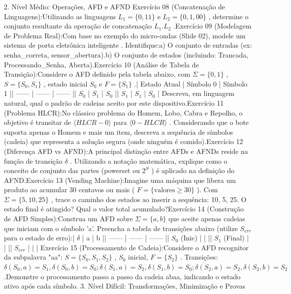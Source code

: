 \documentclass[12pt]{article}
\begin{document}
2. Nível Médio: Operações, AFD e AFND
Exercício 08 (Concatenação de Linguagens):Utilizando as linguagens  $L_1 = \{0, 11\}$  e  $L_2 = \{0, 1, 00\}$ , determine o conjunto resultante da operação de concatenação  $L_1.L_2$ .Exercício 09 (Modelagem de Problema Real):Com base no exemplo do micro-ondas (Slide 02), modele um sistema de  porta eletrônica inteligente . Identifique:a) O conjunto de entradas (ex: senha_correta, sensor_abertura).b) O conjunto de estados (incluindo: Trancada, Processando_Senha, Aberta).Exercício 10 (Análise de Tabela de Transição):Considere o AFD definido pela tabela abaixo, com  $\Sigma = \{0, 1\}$ ,  $S = \{S_0, S_1\}$ , estado inicial  $S_0$  e  $F = \{S_1\}$ .| Estado Atual | Símbolo 0 | Símbolo 1 || ------ | ------ | ------ || $S_0$ | $S_1$ | $S_0$ || $S_1$ | $S_1$ | $S_0$ |
Descreva, em linguagem natural, qual o padrão de cadeias aceito por este dispositivo.Exercício 11 (Problema HLCR):No clássico problema do Homem, Lobo, Cabra e Repolho, o objetivo é transitar de  $\langle HLCR-0 \rangle$  para  $\langle 0-HLCR \rangle$ . Considerando que o bote suporta apenas o Homem e  mais um  item, descreva a sequência de símbolos (cadeia) que representa a solução segura (onde ninguém é comido).Exercício 12 (Diferença AFD vs AFND):A principal distinção entre AFDs e AFNDs reside na função de transição  $\delta$ . Utilizando a notação matemática, explique como o conceito de  conjunto das partes  (powerset ou  $2^S$ ) é aplicado na definição do AFND.Exercício 13 (Vending Machine):Imagine uma máquina que libera um produto ao acumular  30 centavos ou mais  ( $F = \{ \text{valores} \geq 30 \}$ ). Com  $\Sigma = \{5, 10, 25\}$ , trace o caminho dos estados ao inserir a sequência: 10, 5, 25. O estado final é atingido? Qual o valor total acumulado?Exercício 14 (Construção de AFD Simples):Construa um AFD sobre  $\Sigma = \{a, b\}$  que aceite apenas cadeias que iniciam com o símbolo 'a'. Preencha a tabela de transições abaixo (utilize  $S_{err}$  para o estado de erro):| $\delta$ | a | b || ------ | ------ | ------ || $S_0$  (Inic) |  |  || $S_1$  (Final) |  |  || $S_{err}$ |  |  |
Exercício 15 (Processamento de Cadeia):Considere o AFD recognitor da subpalavra "aa":
$S = \{S_0, S_1, S_2\}$ ,  $S_0$  inicial,  $F = \{S_2\}$ .
Transições:  $\delta(S_0, a)=S_1, \delta(S_0, b)=S_0; \delta(S_1, a)=S_2, \delta(S_1, b)=S_0; \delta(S_2, a)=S_2, \delta(S_2, b)=S_2$ .Demonstre o processamento passo a passo da cadeia abaa, indicando o estado ativo após cada símbolo.
3. Nível Difícil: Transformações, Minimização e Provas
\end{document}
